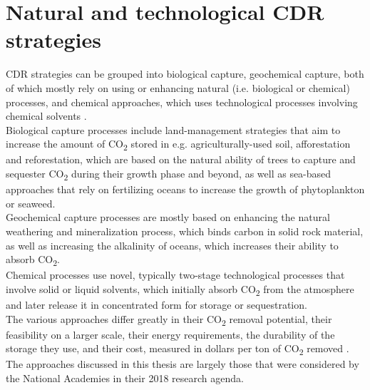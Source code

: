 \section{Natural and technological CDR strategies}
CDR strategies can be grouped into biological capture, geochemical capture, both of which mostly rely on using or enhancing natural (i.e. biological or chemical) processes, and chemical approaches, which uses technological processes involving chemical solvents \parencite{Smith2023TheEdition}.\\
Biological capture processes include land-management strategies that aim to increase the amount of CO\textsubscript{2} stored in e.g. agriculturally-used soil, afforestation and reforestation, which are based on the natural ability of trees to capture and sequester CO\textsubscript{2} during their growth phase and beyond, as well as sea-based approaches that rely on fertilizing oceans to increase the growth of phytoplankton or seaweed.\\
Geochemical capture processes are mostly based on enhancing the natural weathering and mineralization process, which binds carbon in solid rock material, as well as increasing the alkalinity of oceans, which increases their ability to absorb CO\textsubscript{2}.\\
Chemical processes use novel, typically two-stage technological processes that involve solid or liquid solvents, which initially absorb CO\textsubscript{2} from the atmosphere and later release it in concentrated form for storage or sequestration.\\
The various approaches differ greatly in their CO\textsubscript{2} removal potential, their feasibility on a larger scale, their energy requirements, the durability of the storage they use, and their cost, measured in dollars per ton of CO\textsubscript{2} removed \parencite[Chapter 8]{NationalAcademiesofSciences2018NegativeAgenda}.\\The approaches discussed in this thesis are largely those that were considered by the National Academies in their 2018 research agenda.
